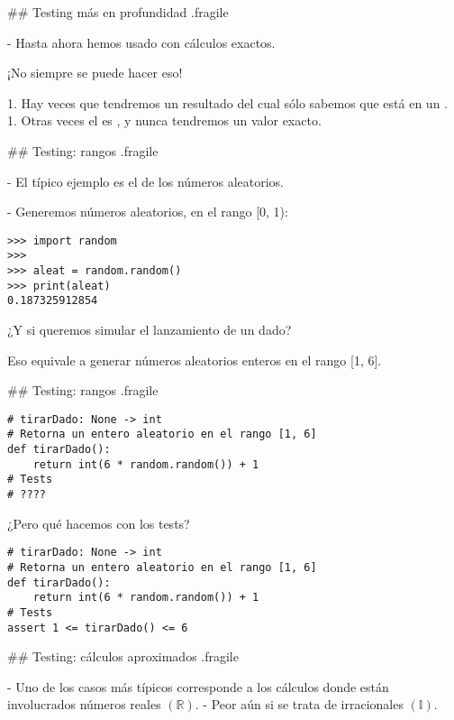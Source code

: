 ## Testing más en profundidad {.fragile}

- Hasta ahora hemos usado  con cálculos exactos.

\pause

\bgnblockdanger
¡No siempre se puede hacer eso!
\trmblockdanger

1. Hay veces que tendremos un resultado del cual sólo sabemos que está en un .
1. Otras veces el  es , y nunca tendremos un valor exacto.

## Testing: rangos {.fragile}


- El típico ejemplo es el de los números aleatorios.

- Generemos números aleatorios, en el rango [0, 1):

\begin{lstlisting}
>>> import random
>>>
>>> aleat = random.random()
>>> print(aleat)
0.187325912854
\end{lstlisting}

\bgnblockgood
¿Y si queremos simular el lanzamiento de un dado?

Eso equivale a
generar números aleatorios enteros en el rango [1, 6].
\trmblockgood

## Testing: rangos {.fragile}

\begin{lstlisting}[style=frame02]
# tirarDado: None -> int
# Retorna un entero aleatorio en el rango [1, 6]
def tirarDado():
    return int(6 * random.random()) + 1
# Tests
# ????
\end{lstlisting}

\pause

\bgnblockdanger
¿Pero qué hacemos con los tests?
\trmblockdanger

\pause

\begin{lstlisting}[style=frame02]
# tirarDado: None -> int
# Retorna un entero aleatorio en el rango [1, 6]
def tirarDado():
    return int(6 * random.random()) + 1
# Tests
assert 1 <= tirarDado() <= 6
\end{lstlisting}

## Testing: cálculos aproximados {.fragile}

- Uno de los casos más típicos corresponde a los cálculos donde están involucrados números reales $(\mathbb{R})$.
    - Peor aún si se trata de irracionales $(\mathbb{I})$.

